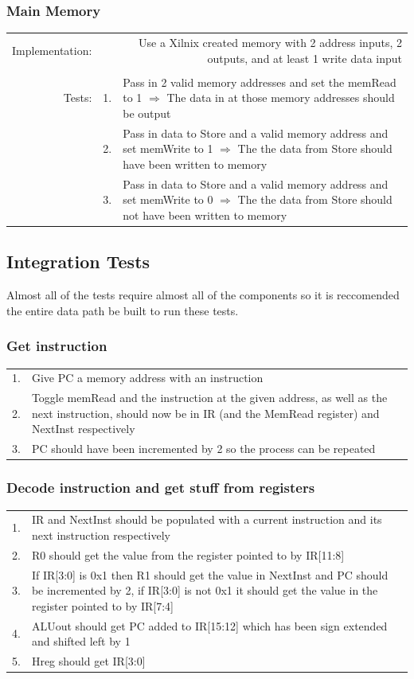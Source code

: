 \documentclass{article}
\begin{document}
		\subsubsection{Main Memory}
			\begin{tabular}{ r  r  p{12cm} }
				Implementation: & \multicolumn{2}{p{12.75cm}}{Use a Xilnix created memory with 2 address inputs, 2 outputs, and at least 1 write data input}\\
				                &    & \\
				         Tests: & 1. & Pass in 2 valid memory addresses and set the memRead to 1 $\Rightarrow$ The data in at those memory addresses should be output\\
				                & 2. & Pass in data to Store and a valid memory address and set memWrite to 1 $\Rightarrow$ The the data from Store should have been written to memory\\
				                & 3. & Pass in data to Store and a valid memory address and set memWrite to 0 $\Rightarrow$ The the data from Store should not have been written to memory\\
			\end{tabular}
	\subsection{Integration Tests}
		Almost all of the tests require almost all of the components so it is reccomended the entire data path be built to run these tests.
		\subsubsection{Get instruction}
			\begin{tabular}{ r  p{15cm} }
				1. & Give PC a memory address with an instruction\\
				2. & Toggle memRead and the instruction at the given address, as well as the next instruction, should now be in IR (and the MemRead register) and NextInst respectively\\
				3. & PC should have been incremented by 2 so the process can be repeated\\
			\end{tabular}
		\subsubsection{Decode instruction and get stuff from registers}
			\begin{tabular}{ r  p{15cm} }
				1. & IR and NextInst should be populated with a current instruction and its next instruction respectively\\
				2. & R0 should get the value from the register pointed to by IR[11:8]\\
				3. & If IR[3:0] is 0x1 then R1 should get the value in NextInst and PC should be incremented by 2, if IR[3:0] is not 0x1 it should get the value in the register pointed to by IR[7:4]\\
				4. & ALUout should get PC added to IR[15:12] which has been sign extended and shifted left by 1\\
				5. & Hreg should get IR[3:0] \\
			\end{tabular}
\end{document}
